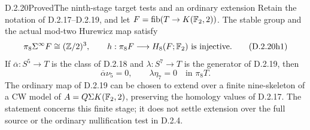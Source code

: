\begin{claim}{D.2.20}{Proved}{The ninth-stage target tests and an ordinary extension}
Retain the notation of D.2.17--D.2.19, and let
$F=\operatorname{fib}(T\to K(\mathbb F_2,2))$. The stable group and the
actual mod-two Hurewicz map satisfy
\[
 \pi_8\Sigma^\infty F\cong(\mathbb Z/2)^3,
 \qquad
 h:\pi_8F\longrightarrow H_8(F;\mathbb F_2)
 \text{ is injective}.
 \tag{D.2.20h1}
\]
If $\overline\alpha:S^5\to T$ is the class of D.2.18
and $\lambda:S^7\to T$ is the generator of D.2.19, then
\[
 \overline\alpha\nu_5=0,
 \qquad \lambda\eta_7=0
 \quad\text{in }\pi_8T.
 \tag{D.2.20h2}
\]
The ordinary map of D.2.19 can be chosen to extend over
a finite nine-skeleton of a CW model of
$A=Q\Sigma K(\mathbb F_2,2)$, preserving the homology values
of D.2.17. The statement concerns this finite stage;
it does not settle extension over the full source or
the ordinary nullification test in D.2.4.
\end{claim}
